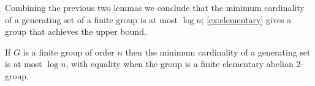Combining the previous two lemmas we conclude that the minimum cardinality of a generating set of a finite group is at most $\log n$; \autoref{ex:elementary} gives a group that achieves the upper bound.

\begin{lemma}\label{lem:log}
  If $G$ is a finite group of order $n$ then the minimum cardinality of a generating set is at most $\log n$, with equality when the group is a finite elementary abelian $2$-group.
\end{lemma}






